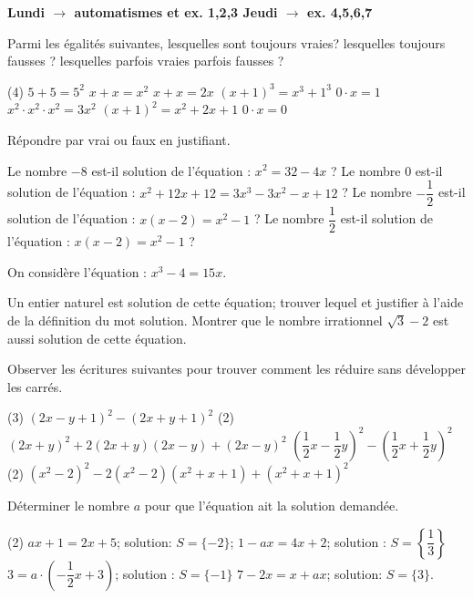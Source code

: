 \documentclass[a4paper,12pt]{report}
\begin{document}
{\bfseries Lundi $\longrightarrow$ automatismes et ex. 1,2,3  \hfill Jeudi $\longrightarrow$ ex. 4,5,6,7}

\begin{exo}[1]
Parmi les égalités suivantes, lesquelles sont toujours vraies? lesquelles toujours fausses ? lesquelles parfois vraies parfois fausses ?
	\begin{tasks}(4)
\task $5+5=5^2$
\task $x+x=x^2$
\task $x+x=2 x$
\task $(x+1)^3=x^3+1^3$
\task $0 \cdot x=1$
\task $x^2 \cdot x^2 \cdot x^2=3 x^2$
\task $(x+1)^2=x^2+2 x+1$
\task $0 \cdot x=0$
	\end{tasks}
\end{exo}
\begin{exo}[1]
	Répondre par vrai ou faux en justifiant.
\begin{tasks}
	\task  Le nombre $-8$ est-il solution de l'équation : $x^2=32-4 x$ ?
\task Le nombre $0$ est-il solution de l'équation : $x^2+12 x+12=3 x^3-3 x^2-x+12$ ?
\task Le nombre $-\dfrac{1}{2}$ est-il solution de l'équation : $x(x-2)=x^2-1$ ?
\task Le nombre $\dfrac{1}{2}$ est-il solution de l'équation : $x(x-2)=x^2-1$ ?
\end{tasks}
\end{exo}
\begin{exo}[2]
On considère l'équation : $x^3-4=15 x$.
	\begin{tasks}
\task Un entier naturel est solution de cette équation; trouver lequel et justifier à l'aide de la définition du mot solution.
\task Montrer que le nombre irrationnel $\sqrt{3}-2$ est aussi solution de cette équation.
	\end{tasks}
\end{exo}
\begin{exo}[2]
Observer les écritures suivantes pour trouver comment les réduire sans développer les carrés.
	\begin{tasks}(3)
\task $(2 x-y+1)^2-(2 x+y+1)^2$
\task*(2) $(2 x+y)^2+2(2 x+y)(2 x-y)+(2 x-y)^2$
\task $\left(\dfrac{1}{2} x-\dfrac{1}{2} y\right)^2-\left(\dfrac{1}{2} x+\dfrac{1}{2} y\right)^2$
\task*(2) $\left(x^2-2\right)^2-2\left(x^2-2\right)\left(x^2+x+1\right)+\left(x^2+x+1\right)^2$
	\end{tasks}
\end{exo}
\begin{exo}[3]
Déterminer le nombre $a$ pour que l'équation ait la solution demandée.
	\begin{tasks}(2)
\task $a x+1=2 x+5$; solution: $S=\{-2\}$;
\task $1-a x=4 x+2$; solution : $S=\left\{\dfrac{1}{3}\right\}$
\task $3=a \cdot\left(-\dfrac{1}{2} x+3\right)$; solution : $S=\{-1\}$
\task $7-2 x=x+a x$; solution: $S=\{3\}$.
	\end{tasks}
\end{exo}
\end{document}
